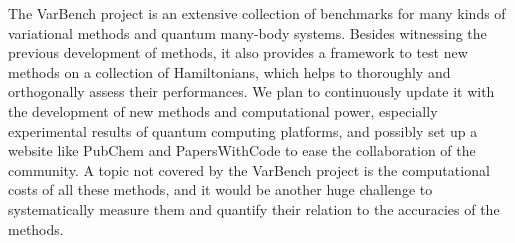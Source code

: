 The VarBench project is an extensive collection of benchmarks for many kinds of variational methods and quantum many-body systems. Besides witnessing the previous development of methods, it also provides a framework to test new methods on a collection of Hamiltonians, which helps to thoroughly and orthogonally assess their performances. We plan to continuously update it with the development of new methods and computational power, especially experimental results of quantum computing platforms, and possibly set up a website like PubChem and PapersWithCode to ease the collaboration of the community. A topic not covered by the VarBench project is the computational costs of all these methods, and it would be another huge challenge to systematically measure them and quantify their relation to the accuracies of the methods.
